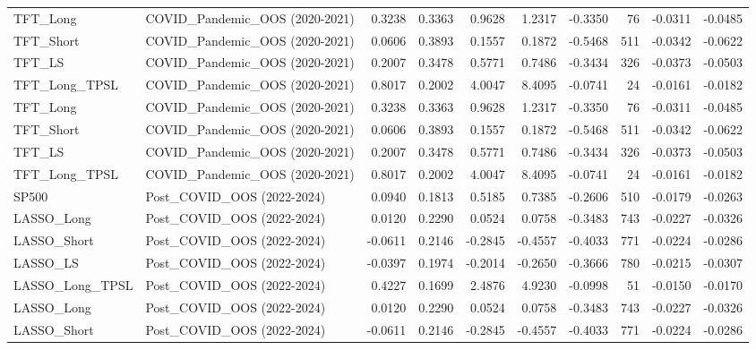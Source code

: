 \begin{tabular}{llrrrrrrrr}
\cline{1-10}
TFT\_Long & COVID\_Pandemic\_OOS (2020-2021) & 0.3238 & 0.3363 & 0.9628 & 1.2317 & -0.3350 & 76 & -0.0311 & -0.0485 \\
\cline{1-10}
TFT\_Short & COVID\_Pandemic\_OOS (2020-2021) & 0.0606 & 0.3893 & 0.1557 & 0.1872 & -0.5468 & 511 & -0.0342 & -0.0622 \\
\cline{1-10}
TFT\_LS & COVID\_Pandemic\_OOS (2020-2021) & 0.2007 & 0.3478 & 0.5771 & 0.7486 & -0.3434 & 326 & -0.0373 & -0.0503 \\
\cline{1-10}
TFT\_Long\_TPSL & COVID\_Pandemic\_OOS (2020-2021) & 0.8017 & 0.2002 & 4.0047 & 8.4095 & -0.0741 & 24 & -0.0161 & -0.0182 \\
\cline{1-10}
TFT\_Long & COVID\_Pandemic\_OOS (2020-2021) & 0.3238 & 0.3363 & 0.9628 & 1.2317 & -0.3350 & 76 & -0.0311 & -0.0485 \\
\cline{1-10}
TFT\_Short & COVID\_Pandemic\_OOS (2020-2021) & 0.0606 & 0.3893 & 0.1557 & 0.1872 & -0.5468 & 511 & -0.0342 & -0.0622 \\
\cline{1-10}
TFT\_LS & COVID\_Pandemic\_OOS (2020-2021) & 0.2007 & 0.3478 & 0.5771 & 0.7486 & -0.3434 & 326 & -0.0373 & -0.0503 \\
\cline{1-10}
TFT\_Long\_TPSL & COVID\_Pandemic\_OOS (2020-2021) & 0.8017 & 0.2002 & 4.0047 & 8.4095 & -0.0741 & 24 & -0.0161 & -0.0182 \\
\cline{1-10}
SP500 & Post\_COVID\_OOS (2022-2024) & 0.0940 & 0.1813 & 0.5185 & 0.7385 & -0.2606 & 510 & -0.0179 & -0.0263 \\
\cline{1-10}
LASSO\_Long & Post\_COVID\_OOS (2022-2024) & 0.0120 & 0.2290 & 0.0524 & 0.0758 & -0.3483 & 743 & -0.0227 & -0.0326 \\
\cline{1-10}
LASSO\_Short & Post\_COVID\_OOS (2022-2024) & -0.0611 & 0.2146 & -0.2845 & -0.4557 & -0.4033 & 771 & -0.0224 & -0.0286 \\
\cline{1-10}
LASSO\_LS & Post\_COVID\_OOS (2022-2024) & -0.0397 & 0.1974 & -0.2014 & -0.2650 & -0.3666 & 780 & -0.0215 & -0.0307 \\
\cline{1-10}
LASSO\_Long\_TPSL & Post\_COVID\_OOS (2022-2024) & 0.4227 & 0.1699 & 2.4876 & 4.9230 & -0.0998 & 51 & -0.0150 & -0.0170 \\
\cline{1-10}
LASSO\_Long & Post\_COVID\_OOS (2022-2024) & 0.0120 & 0.2290 & 0.0524 & 0.0758 & -0.3483 & 743 & -0.0227 & -0.0326 \\
\cline{1-10}
LASSO\_Short & Post\_COVID\_OOS (2022-2024) & -0.0611 & 0.2146 & -0.2845 & -0.4557 & -0.4033 & 771 & -0.0224 & -0.0286 \\
\cline{1-10}

\end{tabular}

